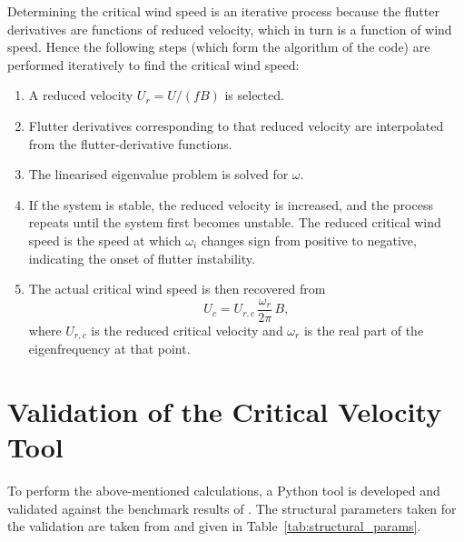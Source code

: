 \documentclass[../main]{subfiles}
\begin{document}
Determining the critical wind speed is an iterative process because the flutter derivatives are functions of reduced velocity, 
which in turn is a function of wind speed. Hence the following steps (which form the algorithm of the code) are 
performed iteratively to find the critical wind speed:

\begin{enumerate}
    \item A reduced velocity \(U_r = U/(fB)\) is selected.
    \item Flutter derivatives corresponding to that reduced velocity are
          interpolated from the flutter-derivative functions.
    \item The linearised eigenvalue problem is solved for \(\omega\).
    \item If the system is stable, the reduced velocity is increased,
          and the process repeats until the system first becomes unstable.
          The reduced critical wind speed is the speed at which \(\omega_i\) changes sign from positive to negative, 
          indicating the onset of flutter instability.
    \item The actual critical wind speed is then recovered from
    \begin{equation}
        U_c = U_{r,c}\,\frac{\omega_r}{2\pi}\,B,
        \label{eq:Uc}
    \end{equation}
    where \(U_{r,c}\) is the reduced critical velocity and \(\omega_r\) is
    the real part of the eigenfrequency at that point.
\end{enumerate}

\section{Validation of the Critical Velocity Tool}

To perform the above-mentioned calculations, a Python tool is developed and validated against the benchmark results of \cite{diana2020}.
The structural parameters taken for the validation are taken from \cite{diana2020} and given in Table~\ref{tab:structural_params}. \\
\end{document}
